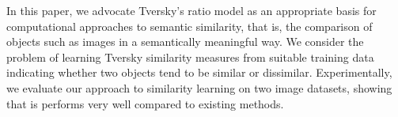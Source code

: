 
In this paper, we advocate Tversky's ratio model as an appropriate basis for computational approaches to semantic similarity, that is, the comparison of objects such as images in a semantically meaningful way. We consider the problem of learning Tversky similarity measures from suitable training data indicating whether two objects tend to be similar or dissimilar. Experimentally, we evaluate our approach to similarity learning on two image datasets, showing that is performs very well compared to existing methods.


